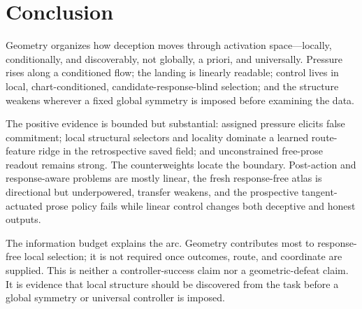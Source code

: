 \section{Conclusion}

Geometry organizes how deception moves through activation space---locally, conditionally, and
discoverably, not globally, a priori, and universally. Pressure rises along a conditioned flow;
the landing is linearly readable; control lives in local, chart-conditioned, candidate-response-blind
selection; and the structure weakens wherever a fixed global symmetry is imposed before examining
the data.

The positive evidence is bounded but substantial: assigned pressure elicits false commitment;
local structural selectors and locality dominate a learned route-feature ridge in the retrospective
saved field; and unconstrained free-prose readout remains strong. The counterweights locate the
boundary. Post-action and response-aware problems are mostly linear, the fresh response-free atlas
is directional but underpowered, transfer weakens, and the prospective tangent-actuated prose
policy fails while linear control changes both deceptive and honest outputs.

The information budget explains the arc. Geometry contributes most to response-free local
selection; it is not required once outcomes, route, and coordinate are supplied. This is neither a
controller-success claim nor a geometric-defeat claim. It is evidence that local structure should
be discovered from the task before a global symmetry or universal controller is imposed.
